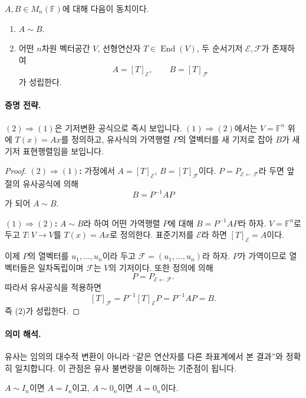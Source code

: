 \begin{theorem}
$A,B\in M_n(\mathbb F)$에 대해 다음이 동치이다.
\begin{enumerate}[label=(\arabic*)]
\item $A\sim B$.
\item 어떤 $n$차원 벡터공간 $V$, 선형연산자 $T\in\operatorname{End}(V)$, 두 순서기저 $\mathcal E,\mathcal F$가 존재하여
$$
A=[T]_{\mathcal E},\qquad B=[T]_{\mathcal F}
$$
가 성립한다.
\end{enumerate}
\end{theorem}

\paragraph{증명 전략.}
$(2)\Rightarrow(1)$은 기저변환 공식으로 즉시 보입니다. $(1)\Rightarrow(2)$에서는 $V=\mathbb F^n$ 위에 $T(x)=Ax$를 정의하고, 유사식의 가역행렬 $P$의 열벡터를 새 기저로 잡아 $B$가 새 기저 표현행렬임을 보입니다.

\begin{proof}
\textbf{$(2)\Rightarrow(1)$:}
가정에서 $A=[T]_{\mathcal E}$, $B=[T]_{\mathcal F}$이다.
$P=P_{\mathcal E\leftarrow\mathcal F}$라 두면 앞 절의 유사공식에 의해
$$
B=P^{-1}AP
$$
가 되어 $A\sim B$.

\textbf{$(1)\Rightarrow(2)$:}
$A\sim B$라 하여 어떤 가역행렬 $P$에 대해 $B=P^{-1}AP$라 하자.
$V=\mathbb F^n$로 두고 $T:V\to V$를 $T(x)=Ax$로 정의한다.
표준기저를 $\mathcal E$라 하면 $[T]_{\mathcal E}=A$이다.

이제 $P$의 열벡터를 $u_1,\dots,u_n$이라 두고 $\mathcal F=(u_1,\dots,u_n)$라 하자.
$P$가 가역이므로 열벡터들은 일차독립이며 $\mathcal F$는 $V$의 기저이다.
또한 정의에 의해
$$
P=P_{\mathcal E\leftarrow\mathcal F}.
$$
따라서 유사공식을 적용하면
$$
[T]_{\mathcal F}=P^{-1}[T]_{\mathcal E}P=P^{-1}AP=B.
$$
즉 (2)가 성립한다.
\end{proof}

\paragraph{의미 해석.}
유사는 임의의 대수적 변환이 아니라 ``같은 연산자를 다른 좌표계에서 본 결과''와 정확히 일치합니다. 이 관점은 유사 불변량을 이해하는 기준점이 됩니다.

\begin{theorem}
$A\sim I_n$이면 $A=I_n$이고, $A\sim 0_n$이면 $A=0_n$이다.
\end{theorem}


